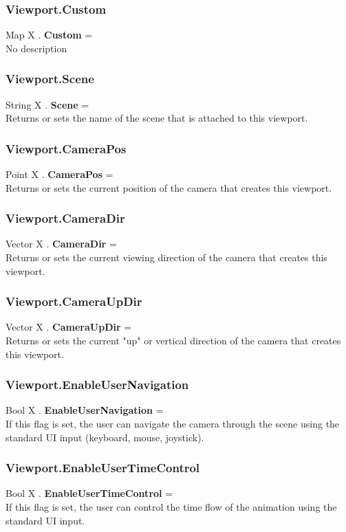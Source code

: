 \subsubsection{Viewport.Custom \label{F:Viewport:Custom}}
Map X . \textbf{Custom} = \\
No description

\subsubsection{Viewport.Scene \label{F:Viewport:Scene}}
String X . \textbf{Scene} = \\
Returns or sets the name of the scene that is attached to this viewport.

\subsubsection{Viewport.CameraPos \label{F:Viewport:CameraPos}}
Point X . \textbf{CameraPos} = \\
Returns or sets the current position of the camera that creates this viewport.

\subsubsection{Viewport.CameraDir \label{F:Viewport:CameraDir}}
Vector X . \textbf{CameraDir} = \\
Returns or sets the current viewing direction of the camera that creates this viewport.

\subsubsection{Viewport.CameraUpDir \label{F:Viewport:CameraUpDir}}
Vector X . \textbf{CameraUpDir} = \\
Returns or sets the current "up" or vertical direction of the camera that creates this viewport.

\subsubsection{Viewport.EnableUserNavigation \label{F:Viewport:EnableUserNavigation}}
Bool X . \textbf{EnableUserNavigation} = \\
If this flag is set, the user can navigate the camera through the scene using the standard UI input (keyboard, mouse, joystick).

\subsubsection{Viewport.EnableUserTimeControl \label{F:Viewport:EnableUserTimeControl}}
Bool X . \textbf{EnableUserTimeControl} = \\
If this flag is set, the user can control the time flow of the animation using the standard UI input.

